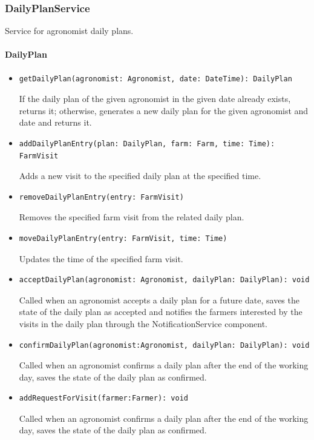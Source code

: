 \documentclass{article}
\begin{document}
\subsubsection{DailyPlanService}
Service for agronomist daily plans.

\paragraph{DailyPlan}
\begin{itemize}
\item \begin{verbatim}
getDailyPlan(agronomist: Agronomist, date: DateTime): DailyPlan
\end{verbatim}
If the daily plan of the given agronomist in the given date already exists, returns it; otherwise, generates a new daily plan for the given agronomist and date and returns it.
\item \begin{verbatim}
addDailyPlanEntry(plan: DailyPlan, farm: Farm, time: Time): FarmVisit
\end{verbatim}
Adds a new visit to the specified daily plan at the specified time.
\item \begin{verbatim}
removeDailyPlanEntry(entry: FarmVisit)
\end{verbatim}
Removes the specified farm visit from the related daily plan.
\item \begin{verbatim}
moveDailyPlanEntry(entry: FarmVisit, time: Time)
\end{verbatim}
Updates the time of the specified farm visit.
\item \begin{verbatim}
acceptDailyPlan(agronomist: Agronomist, dailyPlan: DailyPlan): void
\end{verbatim}
Called when an agronomist accepts a daily plan for a future date, saves the state of the daily plan as accepted and notifies the farmers interested by the visits in the daily plan through the NotificationService component.
\item\begin{verbatim}
confirmDailyPlan(agronomist:Agronomist, dailyPlan: DailyPlan): void
\end{verbatim}
Called when an agronomist confirms a daily plan after the end of the working day, saves the state of the daily plan as confirmed.
\item\begin{verbatim}
addRequestForVisit(farmer:Farmer): void
\end{verbatim}
Called when an agronomist confirms a daily plan after the end of the working day, saves the state of the daily plan as confirmed.
\end{itemize}
\end{document}
